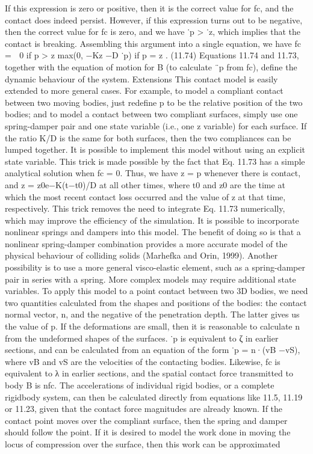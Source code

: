 If this expression is zero or positive, then it is the correct value for fc, and the contact does indeed persist. However, if this expression turns out to be negative, then the correct value for fc is zero, and we have ˙p > ˙z, which implies that the contact is breaking. Assembling this argument into a single equation, we have fc =  0 if p > z max(0, −Kz −D ˙p) if p = z . (11.74) Equations 11.74 and 11.73, together with the equation of motion for B (to calculate ¨p from fc), define the dynamic behaviour of the system. Extensions This contact model is easily extended to more general cases. For example, to model a compliant contact between two moving bodies, just redefine p to be the relative position of the two bodies; and to model a contact between two compliant surfaces, simply use one spring-damper pair and one state variable (i.e., one z variable) for each surface. If the ratio K/D is the same for both surfaces, then the two compliances can be lumped together. It is possible to implement this model without using an explicit state variable. This trick is made possible by the fact that Eq. 11.73 has a simple analytical solution when fc = 0. Thus, we have z = p whenever there is contact, and z = z0e−K(t−t0)/D at all other times, where t0 and z0 are the time at which the most recent contact loss occurred and the value of z at that time, respectively. This trick removes the need to integrate Eq. 11.73 numerically, which may improve the efficiency of the simulation. It is possible to incorporate nonlinear springs and dampers into this model. The benefit of doing so is that a nonlinear spring-damper combination provides a more accurate model of the physical behaviour of colliding solids (Marhefka and Orin, 1999). Another possibility is to use a more general visco-elastic element, such as a spring-damper pair in series with a spring. More complex models may require additional state variables. To apply this model to a point contact between two 3D bodies, we need two quantities calculated from the shapes and positions of the bodies: the contact normal vector, n, and the negative of the penetration depth. The latter gives us the value of p. If the deformations are small, then it is reasonable to calculate n from the undeformed shapes of the surfaces. ˙p is equivalent to ζ in earlier sections, and can be calculated from an equation of the form ˙p = n·(vB −vS), where vB and vS are the velocities of the contacting bodies. Likewise, fc is equivalent to λ in earlier sections, and the spatial contact force transmitted to body B is nfc. The accelerations of individual rigid bodies, or a complete rigidbody system, can then be calculated directly from equations like 11.5, 11.19 or 11.23, given that the contact force magnitudes are already known. If the contact point moves over the compliant surface, then the spring and damper should follow the point. If it is desired to model the work done in moving the locus of compression over the surface, then this work can be approximated

